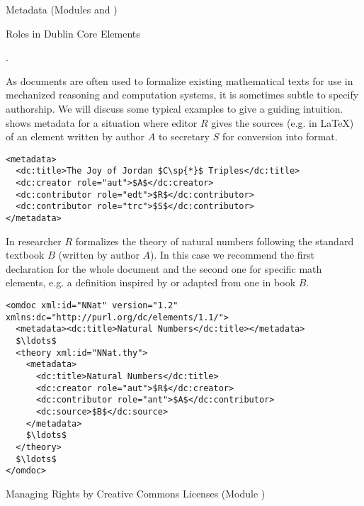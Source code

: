\begin{tchapter}[id=metadata,short=Metadata]{Metadata (Modules {} and  {})}
\begin{tsection}[id=dc-roles]{Roles in Dublin Core Elements}
\begin{description}
  {}.
\end{description}
As {\omdoc} documents are often used to formalize existing mathematical texts for use in
mechanized reasoning and computation systems, it is sometimes subtle to specify
authorship.  We will discuss some typical examples to give a guiding intuition.
{} shows metadata for a situation where editor $R$ gives the sources
(e.g. in {\LaTeX}) of an element written by author $A$ to secretary $S$ for conversion
into {\omdoc} format.
\begin{lstlisting}[label=lst:sec-edt,mathescape,
  caption={A Document with Editor ({\snippet{edt}}) and  Transcriber ({\snippet{trc}})},
  index={metadata,dc:title,dc:creator,dc:contributor}]
<metadata>
  <dc:title>The Joy of Jordan $C\sp{*}$ Triples</dc:title>
  <dc:creator role="aut">$A$</dc:creator>
  <dc:contributor role="edt">$R$</dc:contributor>
  <dc:contributor role="trc">$S$</dc:contributor>
</metadata>
\end{lstlisting}

In {} researcher $R$ formalizes the theory of natural numbers
following the standard textbook $B$ (written by author $A$). In this case we
recommend the first declaration for the whole document and the second one for
specific math elements, e.g. a definition inspired by or adapted from one in book
$B$.

\begin{lstlisting}[label=lst:formalize,mathescape,
  caption={A Formalization with Scientific Antecedent ({\snippet{ant}})},
  index={metadata,dc:title,dc:creator}]
<omdoc xml:id="NNat" version="1.2" xmlns:dc="http://purl.org/dc/elements/1.1/">
  <metadata><dc:title>Natural Numbers</dc:title></metadata>                              
  $\ldots$
  <theory xml:id="NNat.thy">
    <metadata>
      <dc:title>Natural Numbers</dc:title>
      <dc:creator role="aut">$R$</dc:creator>
      <dc:contributor role="ant">$A$</dc:contributor>
      <dc:source>$B$</dc:source>
    </metadata>
    $\ldots$
  </theory>
  $\ldots$
</omdoc>
\end{lstlisting}
\end{tsection}

\begin{tsection}[id=creativecommons,short=Managing Rights]{Managing Rights by Creative
    Commons Licenses (Module {})}


\end{tsection}
\end{tchapter}
